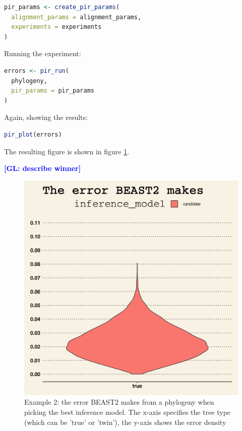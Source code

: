 \documentclass{article}
\newcommand{\giovanni}[1]{\textcolor{blue}{\textbf{[GL: #1]}}}
\begin{document}
\begin{lstlisting}[language=R, floatplacement=H, frame=single]
pir_params <- create_pir_params(
  alignment_params = alignment_params,
  experiments = experiments
)
\end{lstlisting}

Running the experiment:

\begin{lstlisting}[language=R, floatplacement=H, frame=single]
errors <- pir_run(
  phylogeny,
  pir_params = pir_params
)
\end{lstlisting}

Again, showing the results:

\begin{lstlisting}[language=R, floatplacement=H, frame=single]
pir_plot(errors)
\end{lstlisting}

The resulting figure is shown in figure \ref{fig:example_2}.

\giovanni{describe winner}

\begin{figure}[h]
  \includegraphics[width=\textwidth]{figure_example_2.png}
  \caption{
    Example 2: the error BEAST2 makes from a phylogeny when
    picking the best inference model.
    The x-axis specifies the tree type (which can be 'true' or 'twin'),
    the y-axis shows the error density
  }
  \label{fig:example_2}
\end{figure}
\end{document}
